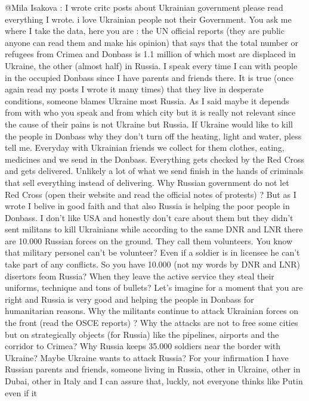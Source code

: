 \begin{itemize}
\begin{itemize}
@Mila Isakova : I wrote critc posts about Ukrainian government please read
everything I wrote. i love Ukrainian people not their Government. You ask me
where I take the data, here you are : the UN official reports (they are public
anyone can read them and make his opinion) that says that the total number or
refugees from Crimea and Donbass is 1.1 million of which most are displaced in
Ukraine, the other (almost half) in Russia. I speak every time I can with
people in the occupied Donbass since I have parents and friends there. It is
true (once again read my posts I wrote it many times) that they live in
desperate conditions, someone blames Ukraine most Russia. As I said maybe it
depends from with who you speak and from which city but it is really not
relevant since the cause of their pains is not Ukraine but Russia. If Ukraine
would like to kill the people in Donbass why they don't turn off the heating,
light and water, pless tell me. Everyday with Ukrainian friends we collect for
them clothes, eating, medicines and we send in the Donbass. Everything gets
checked by the Red Cross and gets delivered. Unlikely a lot of what we send
finish in the hands of criminals that sell everything instead of delivering.
Why Russian government do not let Red Cross (open their website and read the
official notes of protests) ? But as I wrote I belive in good faith and that
also Russia is helping the poor people in Donbass. I don't like USA and
honestly don't care about them but they didn't sent militans to kill Ukrainians
while according to the same DNR and LNR there are 10.000 Russian forces on the
ground. They call them volunteers. You know that military personel can't be
volunteer? Even if a soldier is in licensee he can't take part of any
conflicts. So you have 10.000 (not my words by DNR and LNR) disertors feom
Russia? When they leave the active service they steal their uniforms, technique
and tons of bullets? Let's imagine for a moment that you are right and Russia
is very good and helping the people in Donbass for humanitarian reasons. Why
the militants continue to attack Ukrainian forces on the front (read the OSCE
reports) ? Why the attacks are not to free some cities but on strategically
objects (for Russia) like the pipelines, airports and the corridor to Crimea?
Why Russia keeps 35.000 soldiers near the border with Ukraine? Maybe Ukraine
wants to attack Russia? For your infirmation I have Russian parents and
friends, someone living in Russia, other in Ukraine, other in Dubai, other in
Italy and I can assure that, luckly, not everyone thinks like Putin even if it

\end{itemize}
\end{itemize}
